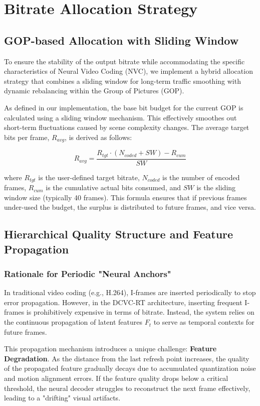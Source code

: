 \section{Bitrate Allocation Strategy}
\label{sec:bit_allocation}

\subsection{GOP-based Allocation with Sliding Window}
To ensure the stability of the output bitrate while accommodating the specific characteristics of Neural Video Coding (NVC), we implement a hybrid allocation strategy that combines a sliding window for long-term traffic smoothing with dynamic rebalancing within the Group of Pictures (GOP).

As defined in our implementation, the base bit budget for the current GOP is calculated using a sliding window mechanism. This effectively smoothes out short-term fluctuations caused by scene complexity changes. The average target bits per frame, $R_{avg}$, is derived as follows:

\begin{equation}
    R_{avg} = \frac{R_{tgt} \cdot (N_{coded} + SW) - R_{cum}}{SW}
\end{equation}

where $R_{tgt}$ is the user-defined target bitrate, $N_{coded}$ is the number of encoded frames, $R_{cum}$ is the cumulative actual bits consumed, and $SW$ is the sliding window size (typically 40 frames). This formula ensures that if previous frames under-used the budget, the surplus is distributed to future frames, and vice versa.

\subsection{Hierarchical Quality Structure and Feature Propagation}
\subsubsection*{Rationale for Periodic "Neural Anchors"}
In traditional video coding (e.g., H.264), I-frames are inserted periodically to stop error propagation. However, in the DCVC-RT architecture, inserting frequent I-frames is prohibitively expensive in terms of bitrate. Instead, the system relies on the continuous propagation of latent features $F_t$ to serve as temporal contexts for future frames.

This propagation mechanism introduces a unique challenge: \textbf{Feature Degradation}. As the distance from the last refresh point increases, the quality of the propagated feature gradually decays due to accumulated quantization noise and motion alignment errors. If the feature quality drops below a critical threshold, the neural decoder struggles to reconstruct the next frame effectively, leading to a "drifting" visual artifacts.

